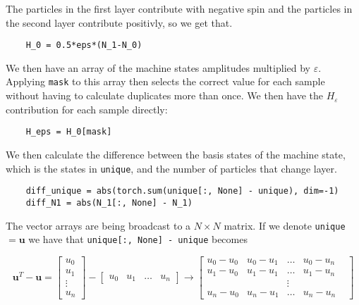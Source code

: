 The particles in the first layer contribute with negative spin and the particles in the second layer contribute positivly, so we get that.

\begin{verbatim} 
    H_0 = 0.5*eps*(N_1-N_0)
\end{verbatim}

We then have an array of the machine states amplitudes multiplied by $\varepsilon$. Applying \texttt{mask} to this array then selects the correct value for each sample without having to calculate duplicates more than once. We then have the $H_{\varepsilon}$ contribution for each sample directly:

\begin{verbatim} 
    H_eps = H_0[mask]
\end{verbatim}

We then calculate the difference between the basis states of the machine state, which is the states in \texttt{unique}, and the number of particles that change layer.

\begin{verbatim}
    diff_unique = abs(torch.sum(unique[:, None] - unique), dim=-1)
    diff_N1 = abs(N_1[:, None] - N_1)
\end{verbatim}

The vector arrays are being broadcast to a $N\times N$ matrix. If we denote \texttt{unique} $ = \boldsymbol{u}$ we have that \texttt{unique[:, None] - unique} becomes

\begin{equation}
  \boldsymbol{u}^T - \boldsymbol{ u } = \begin{bmatrix}
    u_0 \\ u_1 \\ \vdots \\ u_n
    \end{bmatrix} - \begin{bmatrix} u_0 & u_1 & \dots & u_n \end{bmatrix} \rightarrow \begin{bmatrix}
    u_0-u_0& u_0-u_1& \dots& u_0-u_n \\
    u_1-u_0& u_1-u_1& \dots& u_1-u_n \\
           & & \vdots & & \\
    u_n-u_0&u_n-u_1 & \dots & u_n-u_n

  \end{bmatrix}
  \label{eq:imp_ham_lip_unique}
\end{equation}

